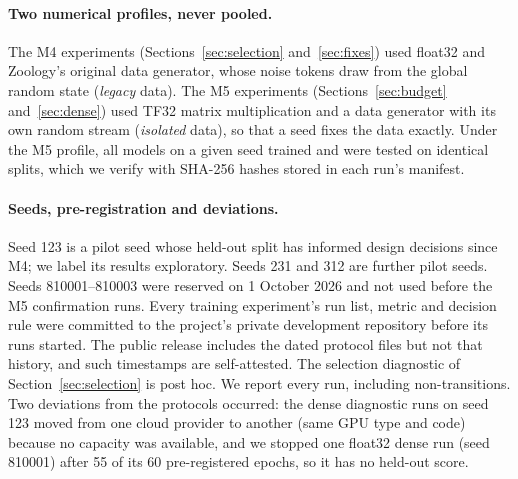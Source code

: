 \paragraph{Two numerical profiles, never pooled.} The M4 experiments (Sections~\ref{sec:selection} and~\ref{sec:fixes}) used float32 and Zoology's original data generator, whose noise tokens draw from the global
random state (\emph{legacy} data). The M5 experiments (Sections~\ref{sec:budget} and~\ref{sec:dense}) used TF32 matrix
multiplication and a data generator with its own random stream (\emph{isolated} data), so that a seed fixes the data
exactly. Under the M5 profile, all models on a given seed trained and were tested on identical splits, which we verify
with SHA-256 hashes stored in each run's manifest.

\paragraph{Seeds, pre-registration and deviations.} Seed 123 is a pilot seed whose held-out split has informed design decisions
since M4; we label its results exploratory. Seeds 231 and 312 are further pilot seeds. Seeds 810001--810003 were
reserved on 1 October 2026 and not used before the M5 confirmation runs. Every training experiment's run list, metric and
decision rule were committed to the project's private development repository before its runs started. The public
release includes the dated protocol files but not that history, and such timestamps are self-attested. The selection diagnostic of Section~\ref{sec:selection} is post hoc. We
report every run, including non-transitions. Two deviations from the protocols occurred: the dense diagnostic runs on
seed 123 moved from one cloud provider to another (same GPU type and code) because no capacity was available, and we
stopped one float32 dense run (seed 810001) after 55 of its 60 pre-registered epochs, so it has no held-out score.
